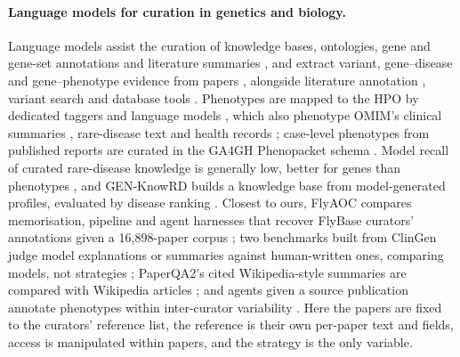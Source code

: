 \documentclass{article} %
\begin{document}
\paragraph{Language models for curation in genetics and biology.}
Language models assist the curation of knowledge bases, ontologies, gene and gene-set annotations and literature summaries \citep{caufield2024structured,caufield2024curategpt,toro2024dynamic,Li2025GenewhispererEnhancing,hu2025evaluation,niyonkuru2025leveraging,Green2026GoflowllmcuratingMirna,Murphy2024HarnessingGenerative,Green2023LitsummLarge}, and extract variant, gene--disease and gene--phenotype evidence from papers \citep{li2025autopm3,furlan2025eagleai,wang2026pubmind,yin2026benchmarking,twede2026evidence}, alongside literature annotation \citep{wei2024pubtator}, variant search \citep{allot2023tracking} and database tools \citep{Jin2023GenegptAugmenting}. Phenotypes are mapped to the HPO by dedicated taggers \citep{luo2021phenotagger,groza2024fasthpocr} and language models \citep{groza2024evaluation,yang2024enhancing,garcia2025improving}, which also phenotype OMIM's clinical summaries \citep{Hier2024HighthroughputPhenotyping}, rare-disease text \citep{Shyr2024IdentifyingExtracting} and health records \citep{Kim2024StructuredExtraction}; case-level phenotypes from published reports are curated \citep{danis2025corpus} in the GA4GH Phenopacket schema \citep{jacobsen2022ga4gh}. Model recall of curated rare-disease knowledge is generally low, better for genes than phenotypes \citep{groza2026systematic}, and GEN-KnowRD builds a knowledge base from model-generated profiles, evaluated by disease ranking \citep{yan2026genknowrd}. Closest to ours, FlyAOC compares memorisation, pipeline and agent harnesses that recover FlyBase curators' annotations given a 16,898-paper corpus \citep{zhang2026flyaoc}; two benchmarks built from ClinGen judge model explanations or summaries against human-written ones, comparing models, not strategies \citep{queen2025cgbench,Saadat2026LargeLanguage}; PaperQA2's cited Wikipedia-style summaries are compared with Wikipedia articles \citep{skarlinski2024language}; and agents given a source publication annotate phenotypes within inter-curator variability \citep{balhoff2026frontier}. Here the papers are fixed to the curators' reference list, the reference is their own per-paper text and fields, access is manipulated within papers, and the strategy is the only variable.
\end{document}
